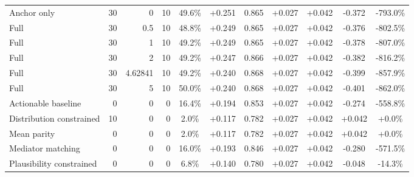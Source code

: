 \begin{table}[htbp]
\begin{tabular}{lrrrccccccc}
Anchor only & 30 & 0 & 10 & 49.6\% & +0.251 & 0.865 & +0.027 & +0.042 & -0.372 & -793.0\% \\
Full & 30 & 0.5 & 10 & 48.8\% & +0.249 & 0.865 & +0.027 & +0.042 & -0.376 & -802.5\% \\
Full & 30 & 1 & 10 & 49.2\% & +0.249 & 0.865 & +0.027 & +0.042 & -0.378 & -807.0\% \\
Full & 30 & 2 & 10 & 49.2\% & +0.247 & 0.866 & +0.027 & +0.042 & -0.382 & -816.2\% \\
Full & 30 & 4.62841 & 10 & 49.2\% & +0.240 & 0.868 & +0.027 & +0.042 & -0.399 & -857.9\% \\
Full & 30 & 5 & 10 & 50.0\% & +0.240 & 0.868 & +0.027 & +0.042 & -0.401 & -862.0\% \\
Actionable baseline & 0 & 0 & 0 & 16.4\% & +0.194 & 0.853 & +0.027 & +0.042 & -0.274 & -558.8\% \\
Distribution constrained & 10 & 0 & 0 & 2.0\% & +0.117 & 0.782 & +0.027 & +0.042 & +0.042 & +0.0\% \\
Mean parity & 0 & 0 & 0 & 2.0\% & +0.117 & 0.782 & +0.027 & +0.042 & +0.042 & +0.0\% \\
Mediator matching & 0 & 0 & 0 & 16.0\% & +0.193 & 0.846 & +0.027 & +0.042 & -0.280 & -571.5\% \\
Plausibility constrained & 0 & 0 & 0 & 6.8\% & +0.140 & 0.780 & +0.027 & +0.042 & -0.048 & -14.3\% \\
\bottomrule
\end{tabular}
\end{table}